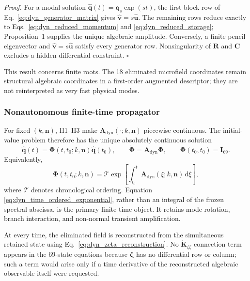 \emph{Proof.}
For a modal solution $\widehat{\boldsymbol q}(t)=
\boldsymbol q_s\exp(st)$, the first block row of
Eq.~\eqref{eq:dyn_generator_matrix} gives
$\widehat{\boldsymbol v}=s\widehat{\boldsymbol u}$.  The remaining rows reduce
exactly to Eqs.~\eqref{eq:dyn_reduced_momentum} and
\eqref{eq:dyn_reduced_storage}; Proposition~1 supplies the unique algebraic
amplitude.  Conversely, a finite pencil eigenvector and
$\widehat{\boldsymbol v}=s\widehat{\boldsymbol u}$ satisfy every generator
row.  Nonsingularity of $\boldsymbol R$ and $\boldsymbol C$ excludes a hidden
differential constraint. \hfill$\square$

This result concerns finite roots.  The 18 eliminated microfield coordinates
remain structural algebraic coordinates in a first-order augmented descriptor;
they are not reinterpreted as very fast physical modes.

\subsubsection{Nonautonomous finite-time propagator}

For fixed $(k,\boldsymbol n)$, H1--H3 make
$\boldsymbol A_{\mathrm{dyn}}(\cdot;k,\boldsymbol n)$ piecewise continuous.
The initial-value problem therefore has the unique absolutely continuous
solution
\begin{equation}
 \widehat{\boldsymbol q}(t)
 =\boldsymbol\Phi(t,t_0;k,\boldsymbol n)
  \widehat{\boldsymbol q}(t_0),
 \qquad
 \dot{\boldsymbol\Phi}
 =\boldsymbol A_{\mathrm{dyn}}\boldsymbol\Phi,
 \qquad
 \boldsymbol\Phi(t_0,t_0)=\boldsymbol I_{69}.
 \label{eq:dyn_propagator_ivp}
\end{equation}
Equivalently,
\begin{equation}
 \boldsymbol\Phi(t,t_0;k,\boldsymbol n)
 =\mathcal T\exp\!\left[
   \int_{t_0}^{t}\boldsymbol A_{\mathrm{dyn}}
   (\xi;k,\boldsymbol n)\,\mathrm d\xi
  \right],
 \label{eq:dyn_time_ordered_exponential}
\end{equation}
where $\mathcal T$ denotes chronological ordering.  Equation
\eqref{eq:dyn_time_ordered_exponential}, rather than an integral of the frozen
spectral abscissa, is the primary finite-time object.  It retains mode rotation,
branch interaction, and non-normal transient amplification.

At every time, the eliminated field is reconstructed from the simultaneous
retained state using Eq.~\eqref{eq:dyn_zeta_reconstruction}.  No
$\dot{\boldsymbol K}_{\zeta\zeta}$ connection term appears in the 69-state
equations because $\boldsymbol\zeta$ has no differential row or column; such a
term would arise only if a time derivative of the reconstructed algebraic
observable itself were requested.


